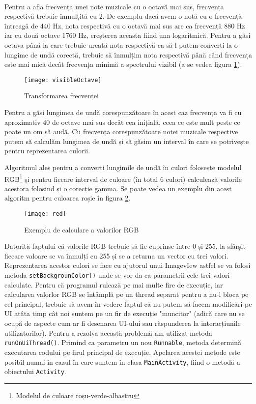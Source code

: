 \documentclass[../IoMusT.tex]{subfiles}
\begin{document}
\\
\par Pentru a afla frecvența unei note muzicale cu o octavă mai sus, frecvența respectivă trebuie înmulțită cu 2. De exemplu dacă avem o notă cu o frecvență întreagă de 440 Hz, nota respectivă cu o octavă mai sus are ca frecvență 880 Hz iar cu două octave 1760 Hz, creșterea aceasta fiind una lo\-ga\-rit\-mi\-că. Pentru a găsi octava până la care trebuie urcată nota res\-pec\-tiv\-ă ca să-l putem converti la o lungime de undă corectă, trebuie să înmulțim nota respectivă până când frecvența este mai mică decât frecvența minimă a spectrului vizibil (a se vedea figura \ref{fig:visibleOctave}).
\begin{figure}[h]
\centering
\texttt{[image: visibleOctave]}
\caption{Transformarea frecvenței}
\label{fig:visibleOctave}
\end{figure} 
Pentru a găsi lungimea de undă corespunzătoare în acest caz frecvența va fi cu aproximativ 40 de octave mai sus decât cea inițială, ceea ce este mult peste ce poate un om să audă. Cu frecvența corespunzătoare notei muzicale respective putem să calculăm lungimea de undă și să găsim un interval în care se potrivește pentru reprezentarea culorii.
\\
\par Algoritmul ales pentru a converti lungimile de undă în culori folosește modelul RGB\footnote{Modelul de culoare roșu-verde-albastru} și pentru fiecare interval de culoare (în total 6 culori) calculează valorile acestora folosind și o corecție gamma. Se poate vedea un e\-xem\-plu din acest algoritm pentru culoarea roșie în figura \ref{fig:red}.
\begin{figure}[h]
\centering
\texttt{[image: red]}
\caption{Exemplu de calculare a valorilor RGB}
\label{fig:red}
\end{figure} 
Datorită faptului că valorile RGB trebuie să fie cuprinse între 0 și 255, la sfârșit fiecare valoare se va înmulți cu 255 și se a returna un vector cu trei valori. Reprezentarea acestor culori se face cu ajutorul unui ImagevIew astfel se va folosi metoda \verb|setBackgrounColor()| unde se vor da ca parametrii cele trei valori calculate. Pentru că programul rulează pe mai multe fire de execuție, iar calcularea valorlor RGB se întâmplă pe un thread separat pentru a nu-l bloca pe cel principal, trebuie să avem în vedere faptul că nu putem să facem modificări pe UI atâta timp cât noi suntem pe un fir de execuție "muncitor" (adică care nu se ocupă de aspecte cum ar fi desenarea UI-ului sau răspunderea la interacțiunile utilizatorilor). Pentru a rezolva această problemă am utilizat metoda \verb|runOnUiThread()|. Primind ca parametru un nou \verb|Runnable|, metoda determină executarea codului pe firul principal de execuție. Apelarea acestei metode este posibil numai în cazul în care suntem în clasa \verb|MainActivity|, fiind o metodă a obiectului \verb|Activity|.
\end{document}
